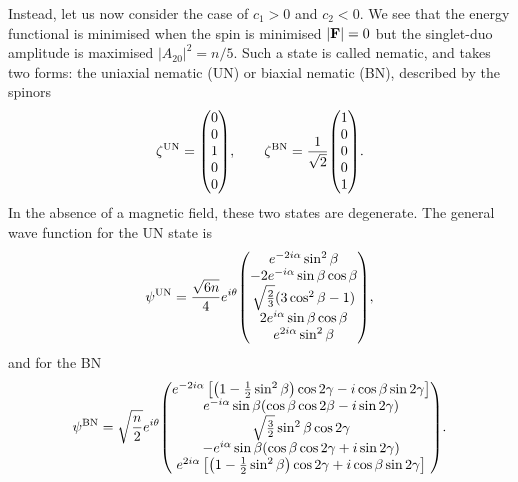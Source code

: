Instead, let us now consider the case of \(c_1 > 0\) and \(c_2 < 0\).
We see that the energy functional is minimised when the spin is minimised
\(|\vb{F}| = 0\) but the singlet-duo amplitude is maximised
\(|A_{20}|^2 = n/5\).
Such a state is called nematic, and takes two forms: the uniaxial nematic (UN)
or biaxial nematic (BN), described by the spinors
\begin{equation}
    \zeta^\mathrm{UN} = \mqty(0 \\ 0 \\ 1 \\ 0 \\ 0), \qquad
    \zeta^\mathrm{BN} = \frac{1}{\sqrt{2}}\mqty(1 \\ 0 \\0 \\ 0 \\ 1).
\end{equation}
In the absence of a magnetic field, these two states are degenerate.
The general wave function for the UN state is
\begin{equation}\label{eq: UN-representative-spinor}
    \psi^\mathrm{UN} = \frac{\sqrt{6n}}{4}e^{i\theta}\mqty(
        e^{-2i\alpha} \sin^2\beta \\
        -2e^{-i\alpha} \sin\beta \cos\beta \\
        \sqrt{\frac{2}{3}}(3\cos^2\beta - 1) \\
        2e^{i\alpha} \sin\beta \cos\beta \\
        e^{2i\alpha} \sin^2\beta
    ),
\end{equation}
and for the BN
\begin{equation}\label{eq: BN-representative-spinor}
    \psi^\mathrm{BN} = \sqrt{\frac{n}{2}}e^{i\theta} \mqty(
        e^{-2i\alpha}\left[\left(1 - \frac{1}{2}\sin^2\beta\right)\cos 2\gamma
                            - i\cos\beta\sin 2\gamma\right] \\
        e^{-i\alpha}\sin\beta(\cos\beta\cos 2\beta - i\sin 2\gamma) \\
        \sqrt{\frac{3}{2}}\sin^2\beta \cos 2\gamma \\
        -e^{i\alpha}\sin\beta(\cos\beta\cos 2\gamma + i\sin 2\gamma) \\
        e^{2i\alpha}\left[\left(1 - \frac{1}{2}\sin^2\beta\right)\cos 2\gamma
                            + i\cos\beta\sin 2\gamma\right]
    ).
\end{equation}


